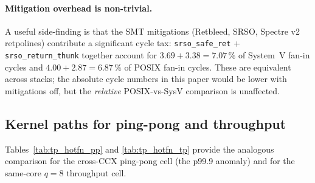 \documentclass[a4paper,11pt]{article}
\begin{document}
\paragraph{Mitigation overhead is non-trivial.} A useful side-finding
is that the SMT mitigations (Retbleed, SRSO, Spectre v2 retpolines)
contribute a significant cycle tax: \texttt{srso\_safe\_ret} +
\texttt{srso\_return\_thunk} together account for $3.69+3.38=7.07\,\%$
of System~V fan-in cycles and $4.00+2.87=6.87\,\%$ of POSIX fan-in
cycles. These are equivalent across stacks; the absolute cycle
numbers in this paper would be lower with mitigations off, but the
\emph{relative} POSIX-vs-SysV comparison is unaffected.

\subsection{Kernel paths for ping-pong and throughput}
\label{sec:perf:other_hotfn}

Tables~\ref{tab:tp_hotfn_pp} and \ref{tab:tp_hotfn_tp} provide the
analogous comparison for the cross-CCX ping-pong cell (the p99.9
anomaly) and for the same-core $q=8$ throughput cell.
\end{document}
